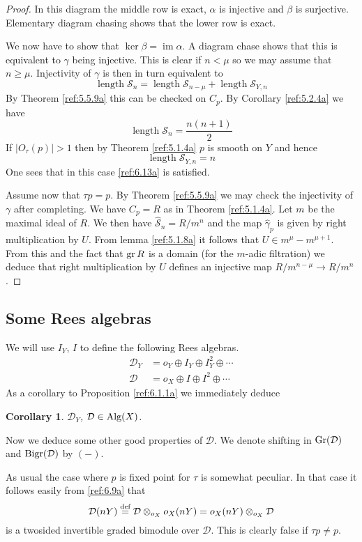 \documentclass{amsproc}
\def\Dscr{{\mathcal D}}
\def\Sscr{{\mathcal S}}
\def\gr{\mathop{\text{gr}}}
\def\Gr{\mathop{\text{Gr}}}
\def\Bigr{\mathop{\text{Bigr}}}
\def\Alg{\mathop{\text{Alg}}}
\def\gr{\operatorname {gr}}
\def\im{\operatorname {im}}
\def\ker{\operatorname {ker}}
\def\gr{\operatorname {gr}}
\def\r{\rightarrow}
\let\oldtext\text
\def\text#1{\oldtext{\upshape #1}}
\DeclareMathOperator{\length}{length}
\newtheorem{corollarys}[lemmas]{Corollary}
\theoremstyle{definition}
\theoremstyle{remark}
\numberwithin{equation}{section}
\numberwithin{table}{section}
\numberwithin{figure}{section}
\def\gr{\mathop{\text{gr}}}
\def\Gr{\mathop{\text{Gr}}}
\begin{document}
\begin{proof}
In this diagram the middle row is exact, $\alpha$ is injective and
$\beta$ is surjective. Elementary diagram chasing shows that the lower
row is exact.

We now have to show that $\ker \beta=\im\alpha$. A diagram chase
shows that this is equivalent to $\gamma$ being injective. This is
clear if $n<\mu$ so we may assume that $n\ge \mu$. Injectivity of $\gamma$ is then
in turn equivalent to 
\begin{equation}
\label{ref:6.13a}
\length \Sscr_n=\length\Sscr_{n-\mu}+\length \Sscr_{Y,n}
\end{equation}
By Theorem
\ref{ref:5.5.9a} this can be checked on $C_p$.  By Corollary
\ref{ref:5.2.4a} we have
\[
\length {\Sscr}_{n}=\frac{n(n+1)}{2}
\]
If $|O_\tau(p)|>1$ then by Theorem \ref{ref:5.1.4a} $p$ is smooth on
$Y$ and hence \[
\length \Sscr_{Y,n}=n
\]
One sees that in this case \eqref{ref:6.13a} is satisfied.  

Assume now that $\tau p=p$. By Theorem \ref{ref:5.5.9a} we may check
the injectivity of $\gamma$ after completing. We have $C_p=R$ as in Theorem
\ref{ref:5.1.4a}.  Let $m$ be the maximal ideal of $R$. We then have
$\hat{\Sscr}_n=R/m^n$ and the map $\hat{\gamma}_p$ is given by right
multiplication by $U$.  From lemma \ref{ref:5.1.8a} it follows that $U\in
m^\mu-m^{\mu+1}$. From this and the fact that $\gr R$ is a domain (for
the $m$-adic filtration) we deduce that right multiplication
by $U$ defines an injective map $R/m^{n-\mu}\r R/m^n$.
\end{proof}


\subsection{Some Rees algebras}
\label{ref:6.2b}
We will
use $I_Y$, ${I}$ to define the following Rees algebras.
\begin{align*}
\Dscr_Y&=o_Y\oplus I_Y\oplus I^2_{Y}\oplus\cdots\\
\Dscr&=o_X\oplus {I}\oplus  I^2 \oplus \cdots
\end{align*}
As a corollary to Proposition \ref{ref:6.1.1a} we immediately deduce
\begin{corollarys}
$\Dscr_Y$, $\Dscr\in \Alg(X)$.
\end{corollarys}
Now we deduce some other good
properties of $\Dscr$. We denote shifting
in $\Gr(\Dscr)$ and $\Bigr(\Dscr)$ by $(-)$.

As usual the case where $p$ is  fixed point for $\tau$ is somewhat
peculiar.
In that case it follows easily from \eqref{ref:6.9a} that
\begin{equation}
\label{ref:6.14a}
\Dscr(nY)\overset{\text{def}}{=}\Dscr\otimes_{o_X}o_X(nY)
=o_X(nY)\otimes_{o_X}\Dscr
\end{equation}
is a twosided invertible graded bimodule over $\Dscr$. This is clearly
false if $\tau p\neq p$. 
\end{document}
